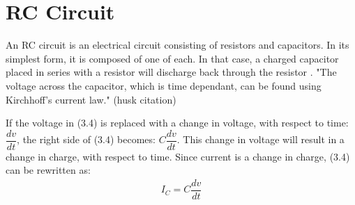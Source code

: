\section{RC Circuit}
An RC circuit is an electrical circuit consisting of resistors and capacitors. In its simplest form, it is composed of one of each. In that case, a charged capacitor placed in series with a resistor will discharge back through the resistor \cite[p~21]{artof}. "The voltage across the capacitor, which is time dependant, can be found using Kirchhoff's current law." (husk citation)

\begin{figure}[H]
 
\end{figure}

If the voltage in (3.4) is replaced with a change in voltage, with respect to time: $\dfrac{dv}{dt}$, the right side of (3.4) becomes: $C\dfrac{dv}{dt}$. This change in voltage will result in a change in charge, with respect to time. Since current is a change in charge, (3.4) can be rewritten as:
\begin{align}\label{I_C}
I_{C}= C \dfrac{dv}{dt}
\end{align}
